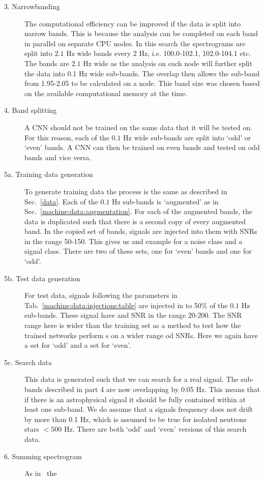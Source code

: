 \begin{description}
	\item[3. Narrowbanding] The computational efficiency can be improved if the data is split into narrow bands.
	This is because the analysis can be completed on each band in parallel on separate CPU nodes. 
	In this search the spectrograms are split into $2.1$ Hz wide bands every $2$ Hz, i.e.
	100.0-102.1, 102.0-104.1 etc. The bands are $2.1$ Hz wide as the analysis on each node will further split the data into 0.1 Hz wide sub-bands. 
	The overlap then allows the sub-band from 1.95-2.05 to be calculated on a node.
	This band size was chosen based on the available
	computational memory at the time. 
	\item[4. Band splitting] A \gls{CNN} should not be trained on the same
	data that it will be tested on.
	For this reason, each of the $0.1$ Hz wide sub-bands are split
	into `odd' or `even' bands. A \gls{CNN} can then be trained on even bands and tested on odd bands and vice versa.
	\item[5a. Training data generation] To generate training data the process is
	the same as described in Sec.~\ref{data}. Each of the $0.1$ Hz sub-bands is
	`augmented' as in Sec.~\ref{machine:data:augmentation}. For each of the augmented
	bands, the data is duplicated such that there is a second copy of every augmented band. 
	In the copied set of bands, signals are injected into them with
	\glspl{SNR} in the range 50-150. This gives us and example for a noise class and
	a signal class. There are two of these sets, one for `even' bands and
	one for `odd'.
	\item[5b. Test data generation] For test data, signals following the parameters in
	Tab.~\ref{machine:data:injections:table} are injected in to 50\% of the $0.1$ Hz
	sub-bands. These signal have and \gls{SNR} in the range 20-200. The \gls{SNR} range here is wider than the training set as a method to test how the trained networks perform s on a wider range od \glspl{SNR}. Here we again have a
	set for `odd' and a set for `even'.
	\item[5c. Search data] This data is generated such that we can search for a
	real signal. The sub-bands described in part 4 are now overlapping by 0.05 Hz.
	This means that if there is an astrophysical signal it should be fully contained within at
	least one sub-band. We do assume that a signals frequency does not drift by more than 0.1 Hz, which is assumed to be true for isolated neutrons stars $< 500$ Hz.  There are both `odd' and `even' versions of this search data.
	\item[6. Summing spectrogram] As in~\cite{bayley2019SOAPGeneralised} the

\end{description}
